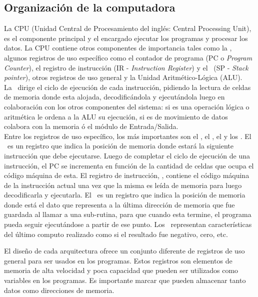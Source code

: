 \subsection{Organización de la computadora}

La CPU (Unidad Central de Procesamiento del inglés: Central Processing Unit), es el componente principal y el encargado ejecutar los programas y procesar los datos. La CPU contiene otros componentes de importancia tales como la \UC, algunos registros de uso específico como el contador de programa (PC o \textit{Program Counter}), el registro de instrucción (IR - \textit{Instruction Register}) y el \SP\ (SP - \textit{Stack pointer}), otros registros de uso general y la Unidad Aritmético-Lógica (ALU).\\

La \UC\ dirige el ciclo de ejecución de cada instrucción, pidiendo la lectura de celdas de memoria donde esta alojada, decodificándola  y ejecutándola luego en colaboración con los otros componentes del sistema: si es una operación lógica o aritmética le ordena a la ALU su ejecución, si es de movimiento de datos colabora con la memoria ó el módulo de Entrada/Salida.\\

Entre los registros de uso específico, los más importantes son el \textbf{\PC}, el \textbf{\IR}, el \textbf{\SP} y los \textbf{\FLAGS}. El \PC\ es un registro que indica la posición de memoria donde estará la siguiente instrucción que debe ejecutarse. Luego de completar el ciclo de ejecución de una instrucción, el PC se incrementa en función de la cantidad de celdas que ocupa el código máquina de esta. 
El registro de instrucción, \textbf{\IR}, contiene el código máquina de la instrucción actual una vez que la misma es leída de memoria para luego decodificarla y ejecutarla.
El \SP\ es un registro que indica la posición de memoria donde está el dato que representa a la última dirección de memoria que fue guardada al llamar a una sub-rutina, para que cuando esta termine, el programa pueda seguir ejecutándose a partir de ese punto.
Los \FLAGS\ representan características del último computo realizado como si el resultado fue negativo, cero, etc.

El diseño de cada arquitectura ofrece un conjunto diferente de registros de uso general para ser usados en los programas. Estos registros son elementos de memoria de alta velocidad y poca capacidad que pueden ser utilizados como variables en los programas. Es importante marcar que pueden almacenar tanto datos como direcciones de memoria.\\

